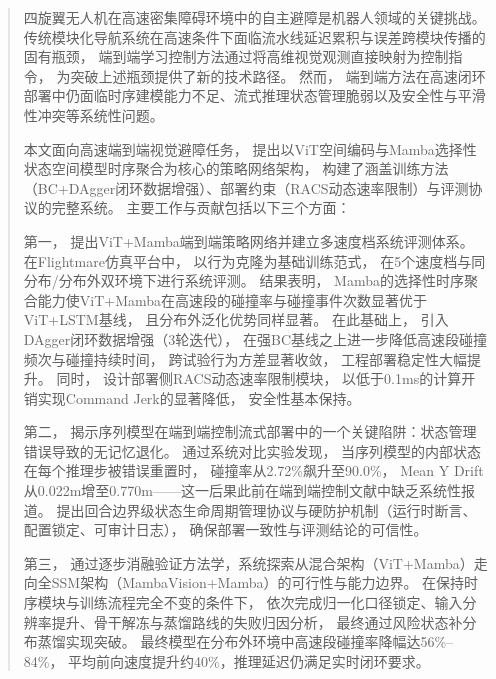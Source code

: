 
\begin{abstract}
四旋翼无人机在高速密集障碍环境中的自主避障是机器人领域的关键挑战。
传统模块化导航系统在高速条件下面临流水线延迟累积与误差跨模块传播的固有瓶颈，
端到端学习控制方法通过将高维视觉观测直接映射为控制指令，
为突破上述瓶颈提供了新的技术路径。
然而，
端到端方法在高速闭环部署中仍面临时序建模能力不足、流式推理状态管理脆弱以及安全性与平滑性冲突等系统性问题。

本文面向高速端到端视觉避障任务，
提出以ViT空间编码与Mamba选择性状态空间模型时序聚合为核心的策略网络架构，
构建了涵盖训练方法（BC+DAgger闭环数据增强）、部署约束（RACS动态速率限制）与评测协议的完整系统。
主要工作与贡献包括以下三个方面：

第一，
提出ViT+Mamba端到端策略网络并建立多速度档系统评测体系。
在Flightmare仿真平台中，
以行为克隆为基础训练范式，
在5个速度档与同分布/分布外双环境下进行系统评测。
结果表明，
Mamba的选择性时序聚合能力使ViT+Mamba在高速段的碰撞率与碰撞事件次数显著优于ViT+LSTM基线，
且分布外泛化优势同样显著。
在此基础上，
引入DAgger闭环数据增强（3轮迭代），
在强BC基线之上进一步降低高速段碰撞频次与碰撞持续时间，
跨试验行为方差显著收敛，
工程部署稳定性大幅提升。
同时，
设计部署侧RACS动态速率限制模块，
以低于0.1ms的计算开销实现Command Jerk的显著降低，
安全性基本保持。

第二，
揭示序列模型在端到端控制流式部署中的一个关键陷阱：状态管理错误导致的无记忆退化。
通过系统对比实验发现，
当序列模型的内部状态在每个推理步被错误重置时，
碰撞率从2.72\%飙升至90.0\%，
Mean Y Drift从0.022m增至0.770m——这一后果此前在端到端控制文献中缺乏系统性报道。
提出回合边界级状态生命周期管理协议与硬防护机制（运行时断言、配置锁定、可审计日志），
确保部署一致性与评测结论的可信性。

第三，
通过逐步消融验证方法学，系统探索从混合架构（ViT+Mamba）走向全SSM架构（MambaVision+Mamba）的可行性与能力边界。
在保持时序模块与训练流程完全不变的条件下，
依次完成归一化口径锁定、输入分辨率提升、骨干解冻与蒸馏路线的失败归因分析，
最终通过风险状态补分布蒸馏实现突破。
最终模型在分布外环境中高速段碰撞率降幅达56\%--84\%，
平均前向速度提升约40\%，推理延迟仍满足实时闭环要求。

\vspace{-2ex}
{} \end{abstract}

